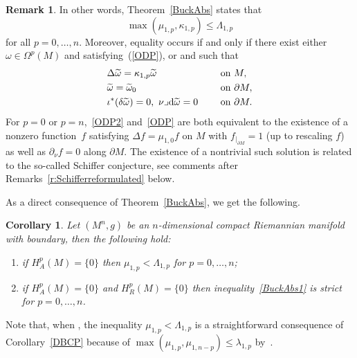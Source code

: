 \documentclass[pdftex]{sigma}
\numberwithin{equation}{section}
\newtheorem{Corollary}[Theorem]{Corollary}
\theoremstyle{definition}
\newtheorem{Remark}[Theorem]{Remark}
\begin{document}
\begin{Remark}
In other words, Theorem~\ref{BuckAbs} states that
\[%
\max (\mu_{1,p},\kappa_{1,p} )\leq\Lambda_{1,p}
\]
for all $p=0,\dots,n$. Moreover, equality occurs if and only if there exist either $\omega\in\Omega^p(M)$ and  satisfying~(\ref{ODP}), or  and  such that
\begin{equation}\label{ODP2}
\begin{aligned}
&\Delta \widetilde{\omega} =\kappa_{1,p} \widetilde{\omega} \ \quad &&\textrm{on } M, \\
&\widetilde{\omega} = \widetilde{\omega}_0 \ \quad && \textrm{on }\partial M, \\
&\iota^*(\delta\widetilde{\omega}) =0,\ \nu\lrcorner {\rm d}\widetilde{\omega} =0\ \quad && \textrm{on }\partial M.
\end{aligned}
\end{equation}
For $p=0$ or $p=n$,~\eqref{ODP2}
and~\eqref{ODP} are both equivalent to the existence of a nonzero function~$f$ satisfying $\Delta f=\mu_{1,0}f$ on $M$ with $f_{|_{\partial M}}=1$ (up to rescaling $f$) as well as $\partial_\nu f=0$ along $\partial M$.
The existence of a nontrivial such solution is related to the so-called Schiffer conjecture, see comments after Remarks~\ref{r:Schifferreformulated} below.
\end{Remark}

As a direct consequence of Theorem~\ref{BuckAbs}, we get the following.
\begin{Corollary}
Let $(M^n,g)$ be an $n$-dimensional compact Riemannian manifold with boundary, then the following hold:
\begin{enumerate}\itemsep=0pt\samepage
\item[$(1)$] if $H^p_A(M)=\{0\}$ then $\mu_{1,p}<\Lambda_{1,p}$ for $p=0,\dots,n$;
\item[$(2)$] if $H^p_A(M)=\{0\}$ and $H^p_R(M)=\{0\}$ then inequality~\eqref{BuckAbs1} is strict for $p=0,\dots,n$.
\end{enumerate}
\end{Corollary}

Note that, when , the inequality $\mu_{1,p}<\Lambda_{1,p}$ is a straightforward consequence of Corollary~\ref{DBCP} because of $\max(\mu_{1,p},\mu_{1,n-p})\leq \lambda_{1,p}$ by~\cite[Proposition~5.4]{elchamiginouxhabib19}.
\end{document}
